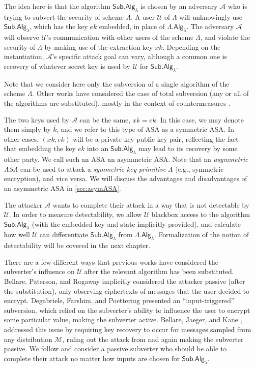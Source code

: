 The idea here is that the algorithm $\mathsf{Sub.Alg}_\lambda$ is chosen by an adversary $\mathcal{A}$ who is trying to subvert the security of scheme $\mathsf{\Lambda}$. A user $\mathcal{U}$ of $\mathsf{\Lambda}$ will unknowingly use $\mathsf{Sub.Alg}_\lambda$, which has the key $ek$ embedded, in place of $\mathsf{\Lambda.Alg}_\lambda$. The adversary $\mathcal{A}$ will observe $\mathcal{U}$'s communication with other users of the scheme $\mathsf{\Lambda}$, and violate the security of $\mathsf{\Lambda}$ by making use of the extraction key $xk$. Depending on the instantiation, $\mathcal{A}$'s specific attack goal can vary, although a common one is recovery of whatever secret key is used by $\mathcal{U}$ for $\mathsf{Sub.Alg}_\lambda$.

Note that we consider here only the subversion of a single algorithm of the scheme $\Lambda$. Other works have considered the case of total subversion (any or all of the algorithms are substituted), mostly in the context of countermeasures \cite{ACNS:AFMV19,CCS:RTYZ17,AC:RTYZ16}.

The two keys used by $\mathcal{A}$ can be the same, $xk=ek$. In this case, we may denote them simply by $\overline{k}$, and we refer to this type of ASA as a symmetric ASA. In other cases, $(xk,ek)$ will be a private key-public key pair, reflecting the fact that embedding the key $ek$ into an $\mathsf{Sub.Alg}_\lambda$ may lead to its recovery by some other party. We call such an ASA an asymmetric ASA. Note that an \emph{asymmetric ASA} can be used to attack a \emph{symmetric-key primitive} $\mathsf{\Lambda}$ (e.g., symmetric encryption), and vice versa. We will discuss the advantages and disadvantages of an asymmetric ASA in \autoref{sec:asymASA}.

The attacker $\mathcal{A}$ wants to complete their attack in a way that is not detectable by $\mathcal{U}$. In order to measure detectability, we allow $\mathcal{U}$ blackbox access to the algorithm $\mathsf{Sub.Alg}_\lambda$ (with the embedded key and state implicitly provided), and calculate how well $\mathcal{U}$ can differentiate $\mathsf{Sub.Alg}_\lambda$ from $\mathsf{\Lambda.Alg}_\lambda$. Formalization of the notion of detectability will be covered in the next chapter.

There are a few different ways that previous works have considered the subverter's influence on $\mathcal{U}$ after the relevant algorithm has been substituted. Bellare, Paterson, and Rogaway \cite{C:BelPatRog14} implicitly considered the attacker passive (after the substitution), only observing ciphertexts of messages that the user decided to encrypt. Degabriele, Farshim, and Poettering \cite{FSE:DegFarPoe15} presented an ``input-triggered'' subversion, which relied on the subverter's ability to influence the user to encrypt some particular value, making the subverter active. Bellare, Jaeger, and Kane \cite{CCS:BelJaeKan15}, addressed this issue by requiring key recovery to occur for messages sampled from any distribution $\mathcal{M}$, ruling out the attack from \cite{FSE:DegFarPoe15} and again making the subverter passive. We follow \cite{CCS:BelJaeKan15} and consider a passive subverter who should be able to complete their attack no matter how inputs are chosen for $\mathsf{Sub.Alg}_\lambda$.
